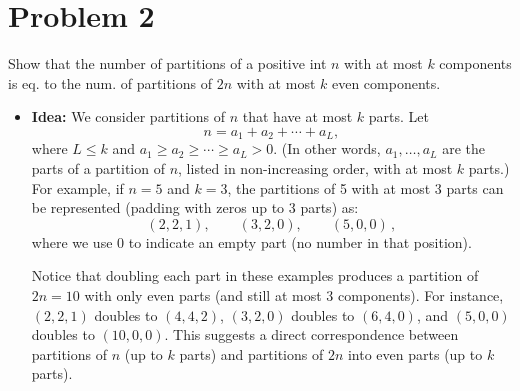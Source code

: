 \documentclass[docmute]{article}
\begin{document}
\vspace{1em} %

\section{Problem 2} Show that the number of partitions of a positive int $n$ with at most $k$ components is eq. to the num. of partitions of $2n$ with at most $k$ even components.

\begin{itemize}
  \item \textbf{Idea:} We consider partitions of $n$ that have at most $k$ parts. Let 
  \[
    n = a_1 + a_2 + \cdots + a_L,
  \] 
  where $L \le k$ and $a_1 \ge a_2 \ge \cdots \ge a_L > 0$. (In other words, $a_1,\ldots,a_L$ are the parts of a partition of $n$, listed in non-increasing order, with at most $k$ parts.) For example, if $n=5$ and $k=3$, the partitions of 5 with at most 3 parts can be represented (padding with zeros up to 3 parts) as:
  \[
    (2,2,1), \qquad (3,2,0), \qquad (5,0,0)\,,
  \] 
  where we use $0$ to indicate an empty part (no number in that position).
  
  Notice that doubling each part in these examples produces a partition of $2n=10$ with only even parts (and still at most 3 components). For instance, $(2,2,1)$ doubles to $(4,4,2)$, $(3,2,0)$ doubles to $(6,4,0)$, and $(5,0,0)$ doubles to $(10,0,0)$. This suggests a direct correspondence between partitions of $n$ (up to $k$ parts) and partitions of $2n$ into even parts (up to $k$ parts).
  

\end{itemize}
\end{document}
